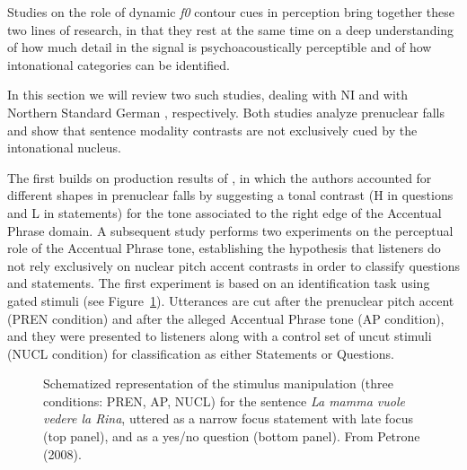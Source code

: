 Studies on the role of dynamic \textit{f0} contour cues in perception bring together these two lines of research, in that they rest at the same time on a deep understanding of how much detail in the signal is psychoacoustically perceptible and of how intonational categories can be identified.
 
In this section we will review two such studies, dealing with NI \citep{petrone2011tones} and with Northern Standard German \citep{petrone2014intonation}, respectively. Both studies analyze prenuclear falls and show that sentence modality contrasts are not exclusively cued by the intonational nucleus. 

The first builds on production results of \citet[see Section~\ref{sec241}]{petrone2008tonal}, in which the authors accounted for different shapes in prenuclear falls by suggesting a tonal contrast (H in questions and L in statements) for the tone associated to the right edge of the Accentual Phrase domain. A subsequent study \citep{petrone2011tones} performs two experiments on the perceptual role of the Accentual Phrase tone, establishing the hypothesis that listeners do not rely exclusively on nuclear pitch accent contrasts in order to classify questions and statements. The first experiment is based on an identification task using gated stimuli (see Figure~\ref{fig301}). Utterances are cut after the prenuclear pitch accent (PREN condition) and after the alleged Accentual Phrase tone (AP condition), and they were presented to listeners along with a control set of uncut stimuli (NUCL condition) for classification as either Statements or Questions. 

\begin{figure}
\centering
{}
\caption{Schematized representation of the stimulus manipulation (three conditions: PREN, AP, NUCL) for the sentence \textit{La mamma vuole vedere la Rina}, uttered as a narrow focus statement with late focus (top panel), and as a yes/no question (bottom panel). From Petrone (2008).}
\label{fig301}\end{figure}

